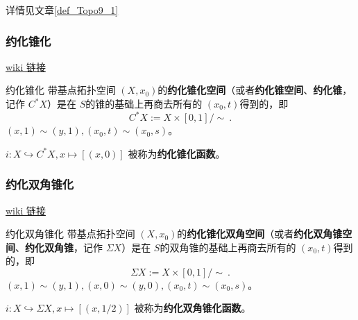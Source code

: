 详情见文章\autoref{def_Topo9_1}~


\subsubsection{约化锥化}

\href{https://en.wikipedia.org/wiki/Cone_(topology)\#Reduced_cone}{wiki 链接}

\begin{definition}{约化锥化}
带基点拓扑空间 $(X, x_0)$的\textbf{约化锥化空间}（或者\textbf{约化锥空间}、\textbf{约化锥}，记作 $C^* X$）是在 $S$的锥的基础上再商去所有的 $(x_0, t)$得到的，即
\[
    C^* X := X \times [0,1] / \sim~.
\]
$(x, 1) \sim (y, 1), (x_0, t) \sim (x_0, s)$。

$i: X \hookrightarrow C^* X, x \mapsto [(x, 0)]$ 被称为\textbf{约化锥化函数}。
\end{definition}

\subsubsection{约化双角锥化}

\href{https://en.wikipedia.org/wiki/Suspension_(topology)\#Reduced_suspension}{wiki 链接}

\begin{definition}{约化双角锥化}
带基点拓扑空间 $(X, x_0)$的\textbf{约化锥化双角空间}（或者\textbf{约化双角锥空间}、\textbf{约化双角锥}，记作 $\Sigma X$）是在 $S$的双角锥的基础上再商去所有的 $(x_0, t)$得到的，即
\[
    \Sigma X := X \times [0,1] / \sim~.
\]
$(x, 1) \sim (y, 1), (x, 0) \sim (y, 0), (x_0, t) \sim (x_0, s)$。

$i: X \hookrightarrow \Sigma X, x \mapsto [(x, 1/2)]$ 被称为\textbf{约化双角锥化函数}。
\end{definition}


